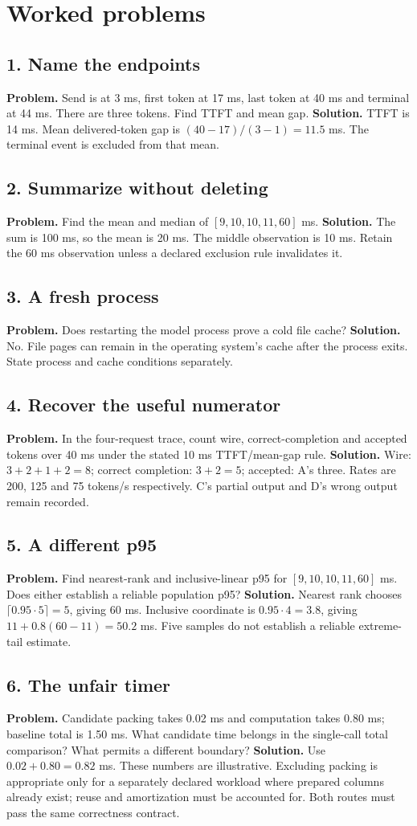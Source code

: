 \section{Worked problems}
\subsection*{1. Name the endpoints}
\textbf{Problem.} Send is at 3 ms, first token at 17 ms, last token at
40 ms and terminal at 44 ms. There are three tokens. Find TTFT and mean gap.
\textbf{Solution.} TTFT is 14 ms. Mean delivered-token gap is
$(40-17)/(3-1)=11.5$ ms. The terminal event is excluded from that mean.
\subsection*{2. Summarize without deleting}
\textbf{Problem.} Find the mean and median of $[9,10,10,11,60]$ ms.
\textbf{Solution.} The sum is 100 ms, so the mean is 20 ms.
The middle observation is 10 ms. Retain the 60 ms observation unless
a declared exclusion rule invalidates it.
\subsection*{3. A fresh process}
\textbf{Problem.} Does restarting the model process prove a cold file cache?
\textbf{Solution.} No. File pages can remain in the operating system's
cache after the process exits. State process and cache conditions separately.
\subsection*{4. Recover the useful numerator}
\textbf{Problem.} In the four-request trace, count wire, correct-completion
and accepted tokens over 40 ms under the stated 10 ms TTFT/mean-gap rule.
\textbf{Solution.} Wire: $3+2+1+2=8$; correct completion: $3+2=5$;
accepted: A's three. Rates are 200, 125 and 75 tokens/s respectively.
C's partial output and D's wrong output remain recorded.
\subsection*{5. A different p95}
\textbf{Problem.} Find nearest-rank and inclusive-linear p95 for
$[9,10,10,11,60]$ ms. Does either establish a reliable population p95?
\textbf{Solution.} Nearest rank chooses $\lceil0.95\cdot5\rceil=5$,
giving 60 ms. Inclusive coordinate is $0.95\cdot4=3.8$,
giving $11+0.8(60-11)=50.2$ ms. Five samples do not establish a
reliable extreme-tail estimate.
\subsection*{6. The unfair timer}
\textbf{Problem.} Candidate packing takes 0.02 ms and computation takes
0.80 ms; baseline total is 1.50 ms. What candidate time belongs in
the single-call total comparison? What permits a different boundary?
\textbf{Solution.} Use $0.02+0.80=0.82$ ms. These numbers are illustrative.
Excluding packing is appropriate only for a separately declared workload
where prepared columns already exist; reuse and amortization must be
accounted for. Both routes must pass the same correctness contract.
